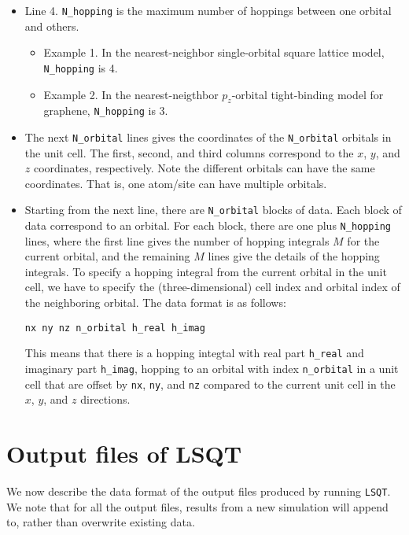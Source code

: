 \documentclass[12pt,a4paper]{report}
\begin{document}
\begin{itemize}
\item Line 4. \verb"N_hopping" is the maximum number of hoppings between one orbital and others. 

\begin{itemize}
\item Example 1. In the nearest-neighbor single-orbital square lattice model,  \verb"N_hopping" is 4. 
\item  Example 2. In the nearest-neigthbor $p_z$-orbital tight-binding model for graphene, \verb"N_hopping" is 3.
\end{itemize}

\item The next \verb"N_orbital" lines gives the coordinates of the \verb"N_orbital" orbitals in the unit cell. The first, second, and third columns correspond to the $x$, $y$, and $z$ coordinates, respectively. Note the different orbitals can have the same coordinates. That is, one atom/site can have multiple orbitals.

\item Starting from the next line, there are \verb"N_orbital" blocks of data. Each block of data correspond to an orbital. For each block, there are one plus \verb"N_hopping" lines, where the first line gives the number of hopping integrals $M$ for the current orbital, and the remaining $M$ lines give the details of the hopping integrals. To specify a hopping integral from the current orbital in the unit cell, we have to specify the (three-dimensional) cell index and orbital index of the neighboring orbital. The data format is as follows:
\begin{verbatim}
nx ny nz n_orbital h_real h_imag
\end{verbatim}
This means that there is a hopping integtal with real part \verb"h_real" and imaginary part \verb"h_imag", hopping to an orbital with index \verb"n_orbital" in a unit cell that are offset by \verb"nx", \verb"ny", and \verb"nz" compared to the current unit cell in the $x$, $y$, and $z$ directions. 

\end{itemize}


\section{Output files of LSQT}

We now describe the data format of the output files produced by running \verb"LSQT". We note that for all the output files, results from a new simulation will append to, rather than overwrite existing data.
\end{document}

